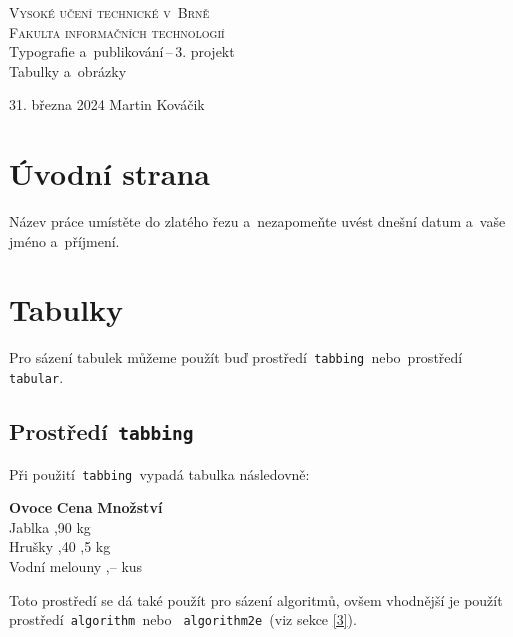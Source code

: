 \documentclass[a4paper, 11pt]{article}
\begin{document}
\begin{titlepage}
    \begin{center}
    \Huge\textsc{Vysoké učení technické v~Brně\\}
        \huge \textsc{Fakulta informačních technologií}\\
        \LARGE{Typografie a~publikování\,--\,3. projekt}\\
        \Huge{Tabulky a~obrázky}
        
        {\Large 31. března 2024 \hfill Martin Kováčik}
        
    \end{center}
\end{titlepage}

\section{Úvodní strana}\label{1}
Název práce umístěte do zlatého řezu a~nezapomeňte uvést dnešní datum a~vaše jméno a~příjmení.

\section{Tabulky}\label{2}
Pro sázení tabulek můžeme použít buď prostředí\texttt{ tabbing }nebo~prostředí\texttt{ tabular}.
\subsection{Prostředí\texttt{ tabbing}}
Při použití\texttt{ tabbing }vypadá tabulka následovně:
\begin{tabbing}
    \textbf{Ovoce} \hspace{1.6cm} \= \textbf{Cena} \hspace{0.3cm} \= \textbf{Množství}\\
    Jablka  ,90  kg\\
    Hrušky  ,40 ,5 kg\\
    Vodní melouny ,--  kus\\
\end{tabbing}
Toto prostředí se dá také použít pro sázení algoritmů, ovšem vhodnější je použít prostředí\texttt{ algorithm }nebo \texttt{ algorithm2e }(viz sekce \ref{3}).
\end{document}
